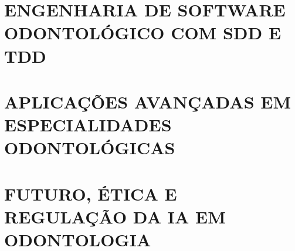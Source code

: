 \documentclass[
  12pt,
  a4paper,
  twoside,
  openright,
  chapter=TITLE,
  section=TITLE,
]{abntex2}
\begin{document}







\part{ENGENHARIA DE SOFTWARE ODONTOLÓGICO COM SDD E TDD}








\part{APLICAÇÕES AVANÇADAS EM ESPECIALIDADES ODONTOLÓGICAS}








\part{FUTURO, ÉTICA E REGULAÇÃO DA IA EM ODONTOLOGIA}






\end{document}
